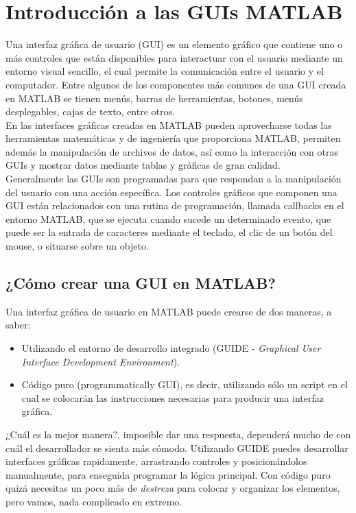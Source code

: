 \chapter{Introducción a las GUIs MATLAB}

Una interfaz gráfica de usuario (GUI) es un elemento gráfico que
contiene uno o más controles que están disponibles para interactuar con
el usuario mediante un entorno visual sencillo, el cual permite la
comunicación entre el usuario y el computador. Entre algunos de los
componentes más comunes de una GUI creada en MATLAB se tienen menús,
barras de herramientas, botones, menús desplegables, cajas de texto,
entre otros. \\

En las interfaces gráficas creadas en MATLAB pueden aprovecharse todas
las herramientas matemáticas y de ingeniería que proporciona MATLAB,
permiten además la manipulación de archivos de datos, así como la
interacción con otras GUIs y mostrar datos mediante tablas y gráficas de
gran calidad. \\

Generalmente las GUIs son programadas para que respondan a la
manipulación del usuario con una acción específica. Los controles
gráficos que componen una GUI están relacionados con una rutina de
programación, llamada callbacks en el entorno MATLAB, que se ejecuta
cuando sucede un determinado evento, que puede ser la entrada de
caracteres mediante el teclado, el clic de un botón del mouse, o
situarse sobre un objeto. \\

\section{¿Cómo crear una GUI en MATLAB?}

Una interfaz gráfica de usuario en MATLAB puede crearse de dos maneras,
a saber:

\begin{itemize}
\item
  Utilizando el entorno de desarrollo integrado (GUIDE - \emph{Graphical
  User Interface Development Environment}).
\item
  Código puro (programmatically GUI), es decir, utilizando sólo un
  script en el cual se colocarán las instrucciones necesarias para
  producir una interfaz gráfica.
\end{itemize}

¿Cuál es la mejor manera?, imposible dar una respuesta, dependerá mucho
de con cuál el desarrollador se sienta más cómodo. Utilizando GUIDE
puedes desarrollar interfaces gráficas rapidamente, arrastrando
controles y posicionándolos manualmente, para enseguida programar la
lógica principal. Con código puro quizá necesitas un poco más de
\emph{destreza} para colocar y organizar los elementos, pero vamos, nada
complicado en extremo. \\

